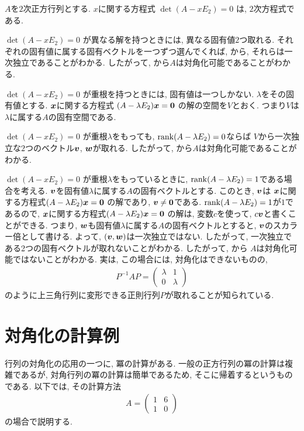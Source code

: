 \begin{remark}
  \label{rem:jordan}
  $A$を$2$次正方行列とする.
  $x$に関する方程式
  $\det(A-xE_2)=0$
  は, $2$次方程式である.
  
  $\det(A-xE_2)=0$
  が異なる解を持つときには,
  異なる固有値$2$つ取れる.
  それぞれの固有値に属する固有ベクトルを一つずつ選んでくれば,
  から,
  それらは一次独立であることがわかる.
  したがって,
  から$A$は対角化可能であることがわかる.

  $\det(A-xE_2)=0$
  が重根を持つときには,
  固有値は一つしかない.
  $\lambda$をその固有値とする.
  $\boldsymbol{x}$に関する方程式
  $(A-\lambda E_2)\boldsymbol{x}=\boldsymbol{0}$
  の解の空間を$V$とおく.
  つまり$V$は$\lambda$に属する$A$の固有空間である.

  $\det(A-xE_2)=0$
  が重根$\lambda$をもっても,
  $\operatorname{rank}(A-\lambda E_2)=0$ならば
  $V$から一次独立な$2$つのベクトル$\boldsymbol{v}$, $\boldsymbol{w}$が取れる.
  したがって,
  から$A$は対角化可能であることがわかる.

  $\det(A-xE_2)=0$
  が重根$\lambda$をもっているときに,
  $\operatorname{rank}(A-\lambda E_2)=1$である場合を考える.
  $\boldsymbol{v}$を固有値$\lambda$に属する$A$の固有ベクトルとする.
  このとき, $\boldsymbol{v}$は
  $\boldsymbol{x}$に関する方程式$(A-\lambda E_2)\boldsymbol{x}=\boldsymbol{0}$
  の解であり, $\boldsymbol{v}\neq \boldsymbol{0}$である.
  $\operatorname{rank}(A-\lambda E_2)=1$が$1$であるので,
  $\boldsymbol{x}$に関する方程式$(A-\lambda E_2)\boldsymbol{x}=\boldsymbol{0}$
  の解は, 変数$c$を使って, $c\boldsymbol{v}$と書くことができる.
  つまり, $\boldsymbol{w}$も固有値$\lambda$に属する$A$の固有ベクトルとすると,
  $\boldsymbol{v}$のスカラー倍として書ける.
  よって, $(\boldsymbol{v},\boldsymbol{w})$は一次独立ではない.
  したがって,
  一次独立である2つの固有ベクトルが取れないことがわかる.
  したがって,
  から
  $A$は対角化可能ではないことがわかる.
  実は, この場合には, 対角化はできないものの,
  \begin{align*}
    P^{-1}AP=\begin{pmatrix}\lambda&1\\0&\lambda \end{pmatrix}
  \end{align*}
  のように上三角行列に変形できる正則行列$P$が取れることが知られている.
\end{remark}



\section{対角化の計算例}
\label{ex:diagonalization}
行列の対角化の応用の一つに, 冪の計算がある.
一般の正方行列の冪の計算は複雑であるが,
対角行列の冪の計算は簡単であるため,
そこに帰着するというものである.
以下では,
その計算方法
\begin{align*}
A=\begin{pmatrix}1&6\\1&0\end{pmatrix}
\end{align*}
の場合で説明する.

